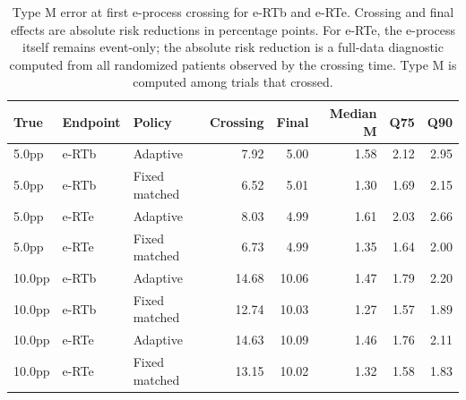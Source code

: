 \begin{table}[htbp]
\centering
\small
\caption{Type M error at first e-process crossing for e-RTb and e-RTe. Crossing and final effects are absolute risk reductions in percentage points. For e-RTe, the e-process itself remains event-only; the absolute risk reduction is a full-data diagnostic computed from all randomized patients observed by the crossing time. Type M is computed among trials that crossed.}
\begin{tabular}{@{}lllrrrrr@{}}
\toprule
True & Endpoint & Policy & Crossing & Final & Median M & Q75 & Q90 \\
\midrule
5.0pp & e-RTb & Adaptive & 7.92 & 5.00 & 1.58 & 2.12 & 2.95 \\
5.0pp & e-RTb & Fixed matched & 6.52 & 5.01 & 1.30 & 1.69 & 2.15 \\
5.0pp & e-RTe & Adaptive & 8.03 & 4.99 & 1.61 & 2.03 & 2.66 \\
5.0pp & e-RTe & Fixed matched & 6.73 & 4.99 & 1.35 & 1.64 & 2.00 \\
10.0pp & e-RTb & Adaptive & 14.68 & 10.06 & 1.47 & 1.79 & 2.20 \\
10.0pp & e-RTb & Fixed matched & 12.74 & 10.03 & 1.27 & 1.57 & 1.89 \\
10.0pp & e-RTe & Adaptive & 14.63 & 10.09 & 1.46 & 1.76 & 2.11 \\
10.0pp & e-RTe & Fixed matched & 13.15 & 10.02 & 1.32 & 1.58 & 1.83 \\
\bottomrule
\end{tabular}
\label{tab:type_m_crossing}
\end{table}
